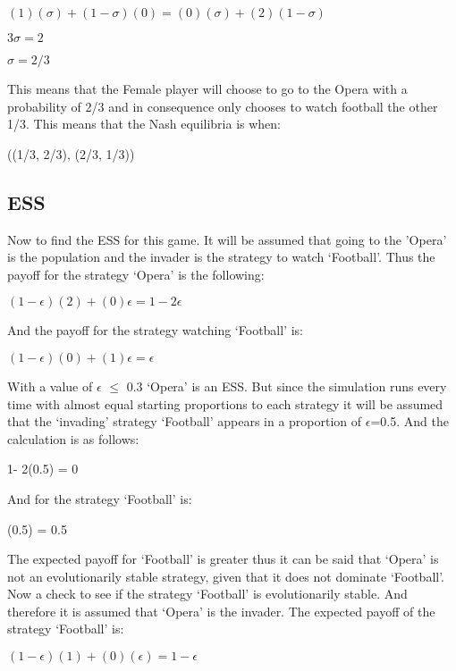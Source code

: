 \begin{center}
$(1)(\sigma) + (1 - \sigma)(0) = (0)(\sigma) + (2)(1 - \sigma)$
\end{center}
\begin{center}
$3\sigma = 2$
\end{center}
\begin{center}
$\sigma = 2/3$
\end{center}

This means that the Female player will choose to go to the Opera with a probability of 2/3 and in consequence only chooses to watch football the other 1/3. 
This means that the Nash equilibria is when:
\begin{center}
((1/3, 2/3), (2/3, 1/3))
\end{center}

\subsection{ESS}
Now to find the ESS for this game. It will be assumed that going to the 'Opera' is the population and the invader is the strategy to watch `Football'. Thus the payoff for the strategy `Opera' is the following:
\begin{center}
$(1-{\epsilon})(2) + (0){\epsilon} = 1 - 2{\epsilon}$
\end{center}
And the payoff for the strategy watching `Football' is:
\begin{center}
$(1-{\epsilon})(0) + (1){\epsilon} = {\epsilon}$
\end{center}
With a value of $\epsilon$ $\leq$ 0.3 `Opera' is an ESS. But since the simulation runs every time with almost equal starting proportions to each strategy it will be assumed that the `invading' strategy `Football' appears in a proportion of $\epsilon$=0.5. And the calculation is as follows:
\begin{center}
1- 2(0.5) = 0
\end{center}
And for the strategy `Football' is:
\begin{center}
 (0.5) = 0.5
\end{center}
The expected payoff for `Football' is greater thus it can be said that `Opera' is not an evolutionarily stable strategy, given that it does not dominate  `Football'.
Now a check to see if the strategy `Football' is evolutionarily stable. And therefore it is assumed that `Opera' is the invader. The expected payoff of the strategy `Football' is:
\begin{center}
$(1-{\epsilon})(1) + (0)({\epsilon}) = 1 - {\epsilon} $
\end{center}
